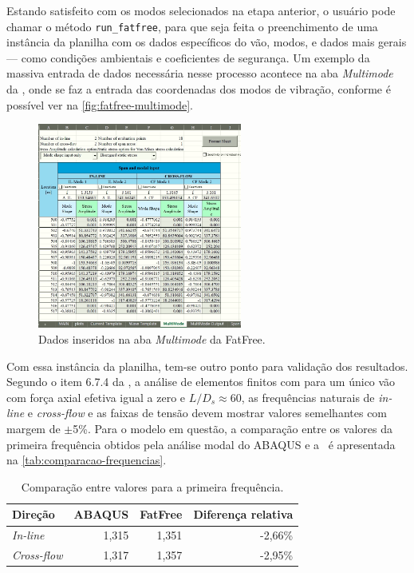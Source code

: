 Estando satisfeito com os modos selecionados na etapa anterior, o usuário pode chamar o método \texttt{run\_fatfree}, para que seja feita o preenchimento de uma instância da planilha com os dados específicos do vão, modos, e dados mais gerais --- como condições ambientais e coeficientes de segurança. Um exemplo da massiva entrada de dados necessária nesse processo acontece na aba \textit{Multimode} da \fatfree, onde se faz a entrada das coordenadas dos modos de vibração, conforme é possível ver na \autoref{fig:fatfree-multimode}.

\begin{figure}[!ht]
	\centering
	\caption{Dados inseridos na aba \textit{Multimode} da FatFree.}\label{fig:fatfree-multimode}
	\includegraphics[width=0.6\textwidth]{imagens/exemplo/fatfree_multimode}
\end{figure}

Com essa instância da planilha, tem-se outro ponto para validação dos resultados.
Segundo o item 6.7.4 da , a análise de elementos finitos com para um único vão com força axial efetiva igual a zero e $L / D_s \approx 60$, as frequências naturais de \textit{in-line} e \textit{cross-flow} e as faixas de tensão devem mostrar valores semelhantes com margem de $\pm$5\%. Para o modelo em questão, a comparação entre os valores da primeira frequência obtidos pela análise modal do ABAQUS e a \fatfree\ é apresentada na \autoref{tab:comparacao-frequencias}.

\begin{table}[!ht]
\renewcommand{\arraystretch}{1.2}
\centering
\caption{Comparação entre valores para a primeira frequência.}\label{tab:comparacao-frequencias}
\begin{tabular}{lrrr}
\toprule
Direção & ABAQUS & FatFree & Diferença relativa\\
\midrule
\textit{In-line}    & 1,315 & 1,351 & -2,66\%\\
\textit{Cross-flow} & 1,317 & 1,357 & -2,95\%\\
\bottomrule
\end{tabular}
\end{table}

